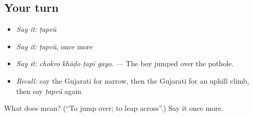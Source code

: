 \subsection*{Your turn}
\begin{itemize}
\raggedright
  \item \emph{Say it:} \emph{ṭapvũ}
  \item \emph{Say it:} \emph{ṭapvũ}, once more
  \item \emph{Say it:} \emph{chokro khāḍo ṭapī gayo.} — The boy jumped over the pothole.
  \item \emph{Recall:} say the Gujarati for narrow, then the Gujarati for an uphill climb, then say \emph{ṭapvũ} again
\end{itemize}

\begin{tcolorbox}[breakable,colback=teal!4,colframe=teal!35!black,title={Before you move on}]
What does  mean? (\textquotedblleft{}To jump over; to leap across\textquotedblright{}.) Say it once more.
\end{tcolorbox}
